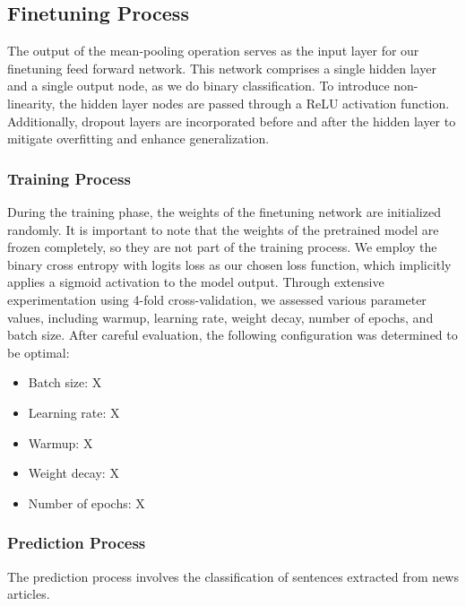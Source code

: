 \documentclass[a4paper,12pt]{report} %
\begin{document}
\subsection{Finetuning Process}
The output of the mean-pooling operation serves as the input layer for our finetuning feed forward network. This network comprises a single hidden layer and a single output node, as we do binary classification. To introduce non-linearity, the hidden layer nodes are passed through a ReLU activation function. Additionally, dropout layers are incorporated before and after the hidden layer to mitigate overfitting and enhance generalization.


\subsubsection{Training Process}
During the training phase, the weights of the finetuning network are initialized randomly. It is important to note that the weights of the pretrained model are frozen completely, so they are not part of the training process. We employ the binary cross entropy with logits loss as our chosen loss function, which implicitly applies a sigmoid activation to the model output. Through extensive experimentation using 4-fold cross-validation, we assessed various parameter values, including warmup, learning rate, weight decay, number of epochs, and batch size. After careful evaluation, the following configuration was determined to be optimal:

\begin{itemize}
  \item Batch size: X
  \item Learning rate: X
  \item Warmup: X
  \item Weight decay: X
  \item Number of epochs: X
\end{itemize}



\subsubsection{Prediction Process}
The prediction process involves the classification of sentences extracted from news articles.
\end{document}
